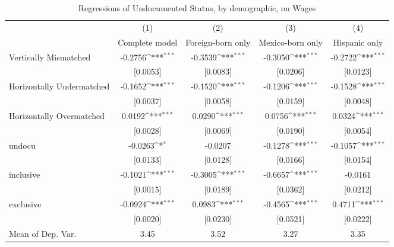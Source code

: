 \begin{table}[htbp]\centering
\def\sym#1{\ifmmode^{#1}\else\(^{#1}\)\fi}
\caption{Regressions of Undocumented Status, by demographic, on Wages}
\begin{tabular}{l*{4}{c}}
\toprule
                    &\multicolumn{1}{c}{(1)}         &\multicolumn{1}{c}{(2)}         &\multicolumn{1}{c}{(3)}         &\multicolumn{1}{c}{(4)}         \\
                    &Complete model         &Foreign-born only         &Mexico-born only         &Hispanic only         \\
\midrule
Vertically Mismatched&     -0.2756\sym{***}&     -0.3539\sym{***}&     -0.3050\sym{***}&     -0.2722\sym{***}\\
                    &    [0.0053]         &    [0.0083]         &    [0.0206]         &    [0.0123]         \\
\addlinespace
Horizontally Undermatched&     -0.1652\sym{***}&     -0.1520\sym{***}&     -0.1206\sym{***}&     -0.1528\sym{***}\\
                    &    [0.0037]         &    [0.0058]         &    [0.0159]         &    [0.0048]         \\
\addlinespace
Horizontally Overmatched&      0.0192\sym{***}&      0.0290\sym{***}&      0.0756\sym{***}&      0.0324\sym{***}\\
                    &    [0.0028]         &    [0.0069]         &    [0.0190]         &    [0.0054]         \\
\addlinespace
undocu              &     -0.0263\sym{*}  &     -0.0207         &     -0.1278\sym{***}&     -0.1057\sym{***}\\
                    &    [0.0133]         &    [0.0128]         &    [0.0166]         &    [0.0154]         \\
\addlinespace
inclusive           &     -0.1021\sym{***}&     -0.3005\sym{***}&     -0.6657\sym{***}&     -0.0161         \\
                    &    [0.0015]         &    [0.0189]         &    [0.0362]         &    [0.0212]         \\
\addlinespace
exclusive           &     -0.0924\sym{***}&      0.0983\sym{***}&     -0.4565\sym{***}&      0.4711\sym{***}\\
                    &    [0.0020]         &    [0.0230]         &    [0.0521]         &    [0.0222]         \\
\midrule
Mean of Dep. Var.   &        3.45         &        3.52         &        3.27         &        3.35         \\

\end{tabular}
\end{table}
